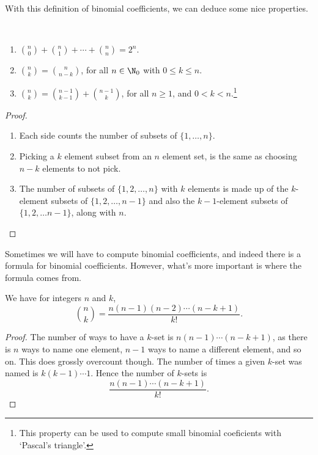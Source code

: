 \documentclass[a4paper]{scrartcl}
\begin{document}
With this definition of binomial coefficients, we can deduce some nice properties.

\begin{proposition}~
	\vspace{-1.5\baselineskip}
	\begin{enumerate}[label=(\roman*)]
	\item $\binom{n}{0} + \binom{n}{1} + \cdots + \binom{n}{n} = 2^n$.
	\item $\binom{n}{k} = \binom{n}{n - k}$, for all $n \in \N_0$ with $0 \leq k \leq n$.
	\item $\binom{n}{k} = \binom{n - 1}{k - 1} + \binom{n - 1}{k}$, for all $n \geq 1$, and $0 < k < n$.\footnote{This property can be used to compute small binomial coeficients with `Pascal's triangle'.}
\end{enumerate}	
\end{proposition}
\begin{proof}
	\begin{enumerate}[label=(\roman*)]
		\item Each side counts the number of subsets of $\{1, \dots, n\}$.
		\item Picking a $k$ element subset from an $n$ element set, is the same as choosing $n - k$ elements to not pick.
		\item The number of subsets of $\{1, 2, \dots, n\}$ with $k$ elements is made up of the $k$-element subsets of $\{1, 2, \dots, n - 1\}$ and also the $k - 1$-element subsets of $\{1, 2, \dots n - 1\}$, along with $n$.
	\end{enumerate}
\end{proof}

Sometimes we will have to compute binomial coefficients, and indeed there is a formula for binomial coefficients. However, what's more important is where the formula comes from.


\begin{proposition}
	We have for integers $n$ and $k$,
	$$
	\binom{n}{k} = \frac{n(n - 1)(n - 2)\cdots (n - k + 1)}{k!}.
	$$
\end{proposition}
\begin{proof}
	The number of ways to have a $k$-set is $n(n - 1)\cdots(n - k + 1)$, as there is $n$ ways to name one element, $n - 1$ ways to name a different element, and so on. This does grossly overcount though. The number of times a given $k$-set was named is $k(k - 1)\cdots 1$. Hence the number of $k$-sets is
	$$
	\frac{n(n - 1)\cdots(n - k + 1)}{k!}.
	$$
\end{proof}
\end{document}
